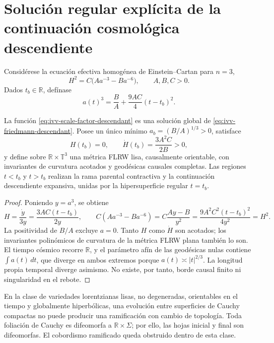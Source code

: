 
\section{Solución regular explícita de la continuación cosmológica descendiente}
\label{sec:ivv-descendant-explicit}

Considérese la ecuación efectiva homogénea de Einstein--Cartan para
\(n=3\),
\begin{equation}
 H^2=C\bigl(Aa^{-3}-Ba^{-6}\bigr),
 \qquad A,B,C>0.
 \label{eq:ivv-friedmann-descendant}
\end{equation}
Dados \(t_b\in\mathbb R\), defínase
\begin{equation}
 a(t)^3=\frac BA+\frac{9AC}{4}(t-t_b)^2.
 \label{eq:ivv-scale-factor-descendant}
\end{equation}

\begin{theorem}
\label{thm:ivv-descendant-existence}
La función \eqref{eq:ivv-scale-factor-descendant} es una solución global de
\eqref{eq:ivv-friedmann-descendant}. Posee un único mínimo
\(a_b=(B/A)^{1/3}>0\), satisface
\[
 H(t_b)=0,
 \qquad
 \dot H(t_b)=\frac{3A^2C}{2B}>0,
\]
y define sobre \(\mathbb R\times\mathbb T^3\) una métrica FLRW lisa,
causalmente orientable, con invariantes de curvatura acotados y geodésicas
causales completas. Las regiones \(t<t_b\) y \(t>t_b\) realizan la rama
parental contractiva y la continuación descendiente expansiva, unidas por la
hipersuperficie regular \(t=t_b\).
\end{theorem}

\begin{proof}
Poniendo \(y=a^3\), se obtiene
\[
 H=\frac{\dot y}{3y}=\frac{3AC(t-t_b)}{2y},
 \qquad
 C(Aa^{-3}-Ba^{-6})
 =C\frac{Ay-B}{y^2}
 =\frac{9A^2C^2(t-t_b)^2}{4y^2}=H^2.
\]
La positividad de \(B/A\) excluye \(a=0\). Tanto \(H\) como \(\dot H\)
son acotados; los invariantes polinómicos de curvatura de la métrica FLRW
plana también lo son. El tiempo cósmico recorre \(\mathbb R\), y el parámetro
afín de las geodésicas nulas contiene \(\int a(t)\,dt\), que diverge en ambos
extremos porque \(a(t)\asymp |t|^{2/3}\). La longitud propia temporal diverge
asimismo. No existe, por tanto, borde causal finito ni singularidad en el
rebote.
\end{proof}

\begin{theorem}
\label{thm:ivv-cobordism-obstruction}
En la clase de variedades lorentzianas lisas, no degeneradas, orientables en
el tiempo y globalmente hiperbólicas, una evolución entre superficies de
Cauchy compactas no puede producir una ramificación con cambio de topología.
Toda foliación de Cauchy es difeomorfa a \(\mathbb R\times\Sigma\); por ello,
las hojas inicial y final son difeomorfas. El cobordismo ramificado queda
obstruido dentro de esta clase.
\end{theorem}

